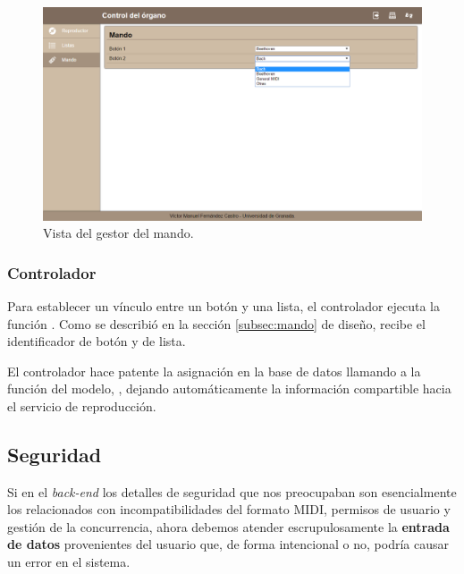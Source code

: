 \smallskip

\begin{figure}[H]
	\noindent \begin{centering}
		\includegraphics[width=\linewidth*2/3]{capitulo5/cap_mando}
		\par\end{centering}
	\smallskip
	\caption{\label{fig:cap_mando} Vista del gestor del mando.}
\end{figure} 

\smallskip

\subsubsection{Controlador}

Para establecer un vínculo entre un botón y una lista, el controlador ejecuta la función . Como se describió en la sección \ref{subsec:mando} de diseño, recibe el identificador de botón y de lista.

El controlador hace patente la asignación en la base de datos llamando a la función del modelo, , dejando automáticamente la información compartible hacia el servicio de reproducción.

\subsection{Seguridad}
\label{subsec:web_seguridad}

Si en el \textit{back-end} los detalles de seguridad que nos preocupaban son esencialmente los relacionados con incompatibilidades del formato \acrshort{MIDI}, permisos de usuario y gestión de la concurrencia, ahora debemos atender escrupulosamente la \textbf{entrada de datos} provenientes del usuario que, de forma intencional o no, podría causar un error en el sistema.

